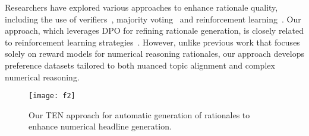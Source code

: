 Researchers have explored various approaches to enhance rationale quality, including the use of verifiers~\cite{cobbe_training_2021}, majority voting~\cite{wang_self-consistency_2023} and reinforcement learning~\cite{wang_math-shepherd_2024}. 
Our approach, which leverages DPO for refining rationale generation, is closely related to reinforcement learning strategies~\citep{wang_math-shepherd_2024}. 
However, unlike previous work that focuses solely on reward models for numerical reasoning rationales, our approach develops preference datasets tailored to both nuanced topic alignment and complex numerical reasoning. 

\begin{figure*}[t]
  \centering
  \texttt{[image: f2]}
  \caption {Our TEN approach for automatic generation of rationales to enhance numerical headline generation.}
  \label{fig:three_phase_of_TEN}
\end{figure*}